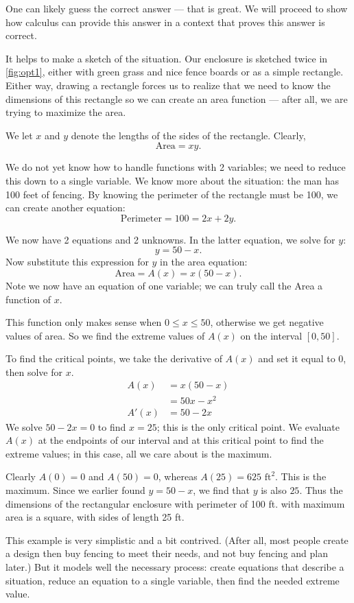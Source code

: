 {One can likely guess the correct answer --- that is great. We will proceed to show how calculus can provide this answer in a context that proves this answer is correct.

It helps to make a sketch of the situation. Our enclosure is sketched twice in \autoref{fig:opt1}, either with green grass and nice fence boards or as a simple rectangle. Either way, drawing a rectangle forces us to realize that we need to know the dimensions of this rectangle so we can create an area function --- after all, we are trying to maximize the area.

We let $x$ and $y$ denote the lengths of the sides of the rectangle. Clearly, \[\text{Area}=xy.\]

We do not yet know how to handle functions with 2 variables; we need to reduce this down to a single variable. We know more about the situation: the man has 100 feet of fencing. By knowing the perimeter of the rectangle must be 100, we can create another equation:
\[\text{Perimeter} = 100 = 2x+2y.\]

We now have 2 equations and 2 unknowns. In the latter equation, we solve for $y$:
\[y = 50-x.\]
Now substitute this expression for $y$ in the area equation:
\[\text{Area} = A(x) = x(50-x).\]
Note we now have an equation of one variable; we can truly call the Area a function of $x$. 

This function only makes sense when $0\leq x \leq 50$, otherwise we get negative values of area. So we find the extreme values of $A(x)$ on the interval $[0,50]$. 

To find the critical points, we take the derivative of $A(x)$ and set it equal to 0, then solve for $x$.
\begin{align*}
A(x) &= x(50-x) \\
			&= 50x-x^2 \\
A'(x) 	&= 50-2x
\end{align*}
We solve $50-2x=0$ to find $x=25$; this is the only critical point. We evaluate $A(x)$ at the endpoints of our interval and at this critical point to find the extreme values; in this case, all we care about is the maximum.

Clearly $A(0)=0$ and $A(50)=0$, whereas $A(25) = 625 \text{ ft}^2$. This is the maximum. Since we earlier found $y = 50-x$, we find that $y$ is also $25$. Thus the dimensions of the rectangular enclosure with perimeter of 100 ft. with maximum area is a square, with sides of length 25 ft.}

This example is very simplistic and a bit contrived. (After all, most people create a design then buy fencing to meet their needs, and not buy fencing and plan later.) But it models well the necessary process: create equations that describe a situation, reduce an equation to a single variable, then find the needed extreme value.

